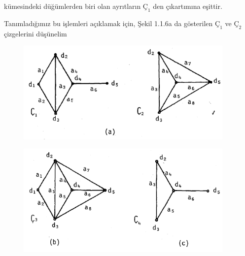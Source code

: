 \documentclass[11pt]{amsbook}
\begin{document}
  kümesindeki düğümlerden biri olan ayrıtların $Ç_1$ den çıkartımına eşittir. 

Tanımladığımız bu işlemleri açıklamak için, Şekil 1.1.6a da gösterilen $Ç_1$ ve $Ç_2$ çizgelerini düşünelim \\

\begin{figure}[htb]
	\centering
	\includegraphics[width=0.95\textwidth]{images/ceyhun-7-fig01}
	\label{fig:1.1.6b}
	
\end{figure}

\begin{figure}[htb]
	\centering
	\includegraphics[width=0.95\textwidth]{images/ceyhun-7-fig02}
	\label{fig:1.1.6b}
	
\end{figure}
\end{document}
